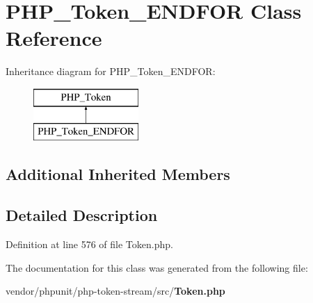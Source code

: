 \section{P\+H\+P\+\_\+\+Token\+\_\+\+E\+N\+D\+F\+O\+R Class Reference}
\label{class_p_h_p___token___e_n_d_f_o_r}
Inheritance diagram for P\+H\+P\+\_\+\+Token\+\_\+\+E\+N\+D\+F\+O\+R\+:\begin{figure}[H]
\begin{center}
\leavevmode
\includegraphics[height=2.000000cm]{class_p_h_p___token___e_n_d_f_o_r}
\end{center}
\end{figure}
\subsection*{Additional Inherited Members}


\subsection{Detailed Description}


Definition at line 576 of file Token.\+php.



The documentation for this class was generated from the following file\+:\begin{DoxyCompactItemize}
\item 
vendor/phpunit/php-\/token-\/stream/src/{\bf Token.\+php}\end{DoxyCompactItemize}

